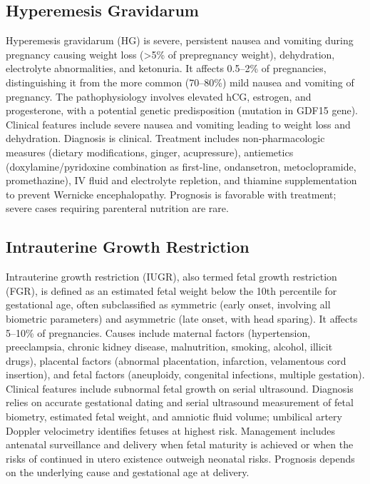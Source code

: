 \subsection{Hyperemesis Gravidarum}
\label{sec:Hyperemesis Gravidarum}
Hyperemesis gravidarum (HG) is severe, persistent nausea and vomiting during pregnancy causing weight loss (>5\% of prepregnancy weight), dehydration, electrolyte abnormalities, and ketonuria. It affects 0.5--2\% of pregnancies, distinguishing it from the more common (70--80\%) mild nausea and vomiting of pregnancy. The pathophysiology involves elevated hCG, estrogen, and progesterone, with a potential genetic predisposition (mutation in GDF15 gene). Clinical features include severe nausea and vomiting leading to weight loss and dehydration. Diagnosis is clinical. Treatment includes non-pharmacologic measures (dietary modifications, ginger, acupressure), antiemetics (doxylamine/pyridoxine combination as first-line, ondansetron, metoclopramide, promethazine), IV fluid and electrolyte repletion, and thiamine supplementation to prevent Wernicke encephalopathy. Prognosis is favorable with treatment; severe cases requiring parenteral nutrition are rare.

\subsection{Intrauterine Growth Restriction}
\label{sec:Intrauterine Growth Restriction}
Intrauterine growth restriction (IUGR), also termed fetal growth restriction (FGR), is defined as an estimated fetal weight below the 10th percentile for gestational age, often subclassified as symmetric (early onset, involving all biometric parameters) and asymmetric (late onset, with head sparing). It affects 5--10\% of pregnancies. Causes include maternal factors (hypertension, preeclampsia, chronic kidney disease, malnutrition, smoking, alcohol, illicit drugs), placental factors (abnormal placentation, infarction, velamentous cord insertion), and fetal factors (aneuploidy, congenital infections, multiple gestation). Clinical features include subnormal fetal growth on serial ultrasound. Diagnosis relies on accurate gestational dating and serial ultrasound measurement of fetal biometry, estimated fetal weight, and amniotic fluid volume; umbilical artery Doppler velocimetry identifies fetuses at highest risk. Management includes antenatal surveillance and delivery when fetal maturity is achieved or when the risks of continued in utero existence outweigh neonatal risks. Prognosis depends on the underlying cause and gestational age at delivery.

